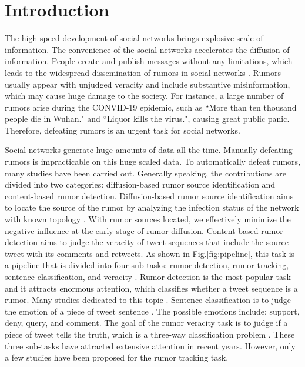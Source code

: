 \section{Introduction}
\label{sec:introduction}
The high-speed development of social networks brings explosive scale of information. The convenience of the social networks accelerates the diffusion of information. People create and publish messages without any limitations, which leads to the widespread dissemination of rumors in social networks \cite{DBLP:journals/corr/KurkaGZ15, DBLP:journals/csur/ZubiagaABLP18, DBLP:conf/sirocco/KostkaOW08, vosoughi2018spread}. Rumors usually appear with unjudged veracity and include substantive misinformation, which may cause huge damage to the society. For instance, a large number of rumors arise during the CONVID-19 epidemic, such as ``More than ten thousand people die in Wuhan." and ``Liquor kills the virus.", causing great public panic. Therefore, defeating rumors is an urgent task for social networks.

Social networks generate huge amounts of data all the time. Manually defeating rumors is impracticable on this huge scaled data. To automatically defeat rumors, many studies have been carried out. Generally speaking, the contributions are divided into two categories:  diffusion-based rumor source identification and content-based rumor detection. Diffusion-based rumor source identification aims to locate the source of the rumor by analyzing the infection status of the network with known topology \cite{DBLP:conf/sigmetrics/ShahZ10, DBLP:journals/tit/ShahZ11, DBLP:conf/kdd/LappasTGM10}. With rumor sources located, we effectively minimize the negative influence at the early stage of rumor diffusion. Content-based rumor detection aims to judge the veracity of tweet sequences that include the source tweet with its comments and retweets. As shown in Fig.\ref{fig:pipeline}, this task is a pipeline that is divided into four sub-tasks: rumor detection, rumor tracking, sentence classification, and veracity \cite{DBLP:journals/csur/ZubiagaABLP18, DBLP:conf/coling/KochkinaLZ18}. Rumor detection is the most popular task and it attracts enormous attention, which classifies whether a tweet sequence is a rumor. Many studies dedicated to this topic \cite{DBLP:conf/socinfo/ZubiagaLP17, DBLP:conf/www/Ma0W19,DBLP:conf/naacl/NguyenDCD19, DBLP:journals/corr/abs-1906-05659}. Sentence classification is to judge the emotion of a piece of tweet sentence \cite{DBLP:conf/semeval/EnayetE17, DBLP:conf/semeval/X17a, DBLP:conf/coling/ZubiagaKLPL16}. The possible emotions include: support, deny, query, and comment. The goal of the rumor veracity task is to judge if a piece of tweet tells the truth, which is a three-way classification problem \cite{DBLP:conf/coling/KochkinaLZ18, DBLP:conf/acl/LiZS19, DBLP:conf/acl/KumarC19}. These three sub-tasks have attracted extensive attention in recent years. However, only a few studies have been proposed for the rumor tracking task.

